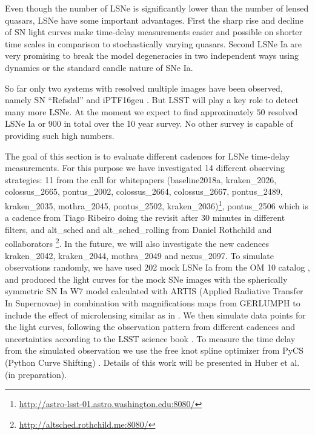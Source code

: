 Even though the number of LSNe is significantly lower than the number of
lensed quasars, LSNe have some important advantages. First 
the sharp rise
and decline of SN light curves make time-delay measurements easier and possible
on shorter time scales in comparison to stochastically varying quasars. Second LSNe Ia are very promising
to break the model degeneracies \citep{Schneider:2013wga} in two
independent ways using dynamics \citep{Barnabe2011,2017:Yildirim} or
the standard candle nature of SNe Ia.  

So far only two systems with resolved
multiple images have been observed, namely SN ``Refsdal''
\citep{Kelly:2015xvu,Kelly:2015vjq} and iPTF16geu
\citep{Goobar:2016uuf}. But LSST will play a key role to detect many
more LSNe. At the moment we expect to find approximately $50$ resolved
LSNe Ia \citep{Oguri:2010} or $900$ in total \citep{Goldstein:2017bny}
over the 10 year survey. No other survey is capable of providing such
high numbers.

The goal of this section is to evaluate different
cadences for LSNe time-delay measurements. For this purpose we have investigated
14 different observing strategies: 11 from the call for whitepapers
(baseline2018a, kraken\_2026, colossus\_2665, pontus\_2002,
colossus\_2664, colossus\_2667, pontus\_2489, kraken\_2035,
mothra\_2045, pontus\_2502,
kraken\_2036)\footnote{\url{http://astro-lsst-01.astro.washington.edu:8080/}},
pontus\_2506 which is a cadence from Tiago Ribeiro doing the revisit
after 30 minutes in different filters, and alt\_sched and
alt\_sched\_rolling from Daniel Rothchild and collaborators
\footnote{\url{http://altsched.rothchild.me:8080/}}. In the future, we
will also investigate the new cadences kraken\_2042, kraken\_2044,
mothra\_2049 and nexus\_2097. To simulate observations randomly, we have used 202
mock LSNe Ia from the OM 10 catalog \citep{Oguri:2010},
and produced the light curves for the mock SNe images with
the spherically symmetric SN Ia W7 model \citep{1984:Nomoto}
calculated with ARTIS (Applied Radiative Transfer In Supernovae)
\citep{Kromer:2009ce} in combination with magnifications maps from
GERLUMPH \citep{Vernardos:2015wta} to include the effect of
microlensing similar as in \citep{Goldstein:2017bny}. We then simulate
data points for the light curves, following the observation pattern from different cadences
and uncertainties according to the LSST science book
\citep{2009:LSSTscience}. To measure the time delay from the simulated
observation we use the free knot spline optimizer from PyCS (Python
Curve Shifting) \citep{2013:Tewesb,Bonvin:2015jia}. Details of this
work will be presented in Huber et al. (in preparation).


